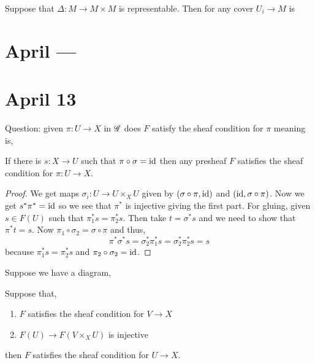 \documentclass[12pt]{article}
\begin{document}
\begin{rmk}
Suppose that $\Delta : M \to M \times M$ is representable. Then for any cover $U_i \to M$ is 
\end{rmk}

\section{April ---}

\section{April 13}

Question: given $\pi : U \to X$ in $\mathscr{G}$ does $F$ satisfy the sheaf condition for $\pi$ meaning is,
\begin{center}
\end{center}

\begin{theorem}
If there is $s : X \to U$ such that $\pi \circ \sigma = \mathrm{id}$ then any presheaf $F$ satisfies the sheaf condition for $\pi : U \to X$. 
\end{theorem}

\begin{proof}
We get maps $\sigma_i : U \to U \times_X U$ given by $(\sigma \circ \pi, \mathrm{id})$ and $(\mathrm{id}, \sigma \circ \pi)$. Now we get $s^* \pi^* = \mathrm{id}$ so we see that $\pi^*$ is injective giving the first part. For gluing, given $s \in F(U)$ such that $\pi_1^* s = \pi_2^* s$. Then take $t = \sigma^* s$ and we need to show that $\pi^* t = s$.  Now $\pi_1 \circ \sigma_2 = \sigma \circ \pi$ and thus,
\[ \pi^* \sigma^* s = \sigma_2^* \pi_1^* s = \sigma_2^* \pi_2^* s = s \]
because $\pi_1^* s = \pi_2^* s$ and $\pi_2 \circ \sigma_2 = \mathrm{id}$.
\end{proof}

\begin{cor}
Suppose we have a diagram,
\begin{center}
\end{center}
Suppose that,
\begin{enumerate}
\item $F$ satisfies the sheaf condition for $V \to X$

\item $F(U) \to F(V \times_X U)$ is injective 
\end{enumerate}
then $F$ satisfies the sheaf condition for $U \to X$.
\end{cor}
\end{document}
